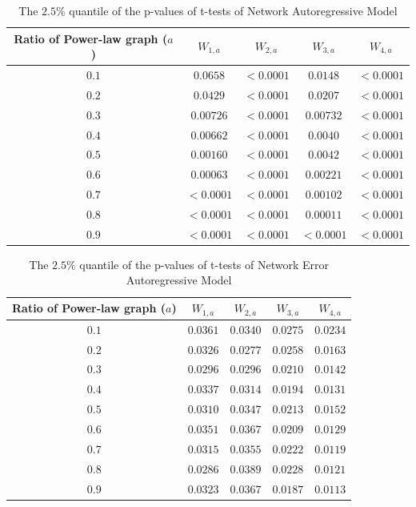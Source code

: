 \documentclass[times, doublespace]{auth}
\begin{document}
\begin{table}
	\centering
	\caption{The $2.5\%$ quantile of the p-values of t-tests of Network Autoregressive Model}
	\label{table2c}
	\begin{tabular}{|c|c|c|c|c|}
		\hline
		Ratio of Power-law graph ($a$)&$W_{1,a}$&$W_{2,a}$&$W_{3,a}$&$W_{4,a}$\\
		\hline
		$0.1$ & $0.0658$ & $< 0.0001$ & $0.0148$ & $< 0.0001$\\
		\hline
		$0.2$ & $0.0429$ & $< 0.0001$ & $0.0207$ & $< 0.0001$\\
		\hline
		$0.3$ & $0.00726$ & $< 0.0001$ & $0.00732$ & $< 0.0001$\\
		\hline
		$0.4$ & $0.00662$ & $< 0.0001$ & $0.0040$ & $< 0.0001$\\
		\hline
		$0.5$ & $0.00160$ & $< 0.0001$ & $0.0042$ & $< 0.0001$\\
		\hline
		$0.6$ & $0.00063$ & $< 0.0001$ & $0.00221$ & $< 0.0001$\\
		\hline
		$0.7$ &  $< 0.0001$ & $< 0.0001$ & $0.00102$ & $< 0.0001$\\
		\hline
		$0.8$ &  $< 0.0001$ & $< 0.0001$ & $0.00011$ & $< 0.0001$\\
		\hline
		$0.9$ &  $< 0.0001$ & $< 0.0001$ & $< 0.0001$ & $< 0.0001$\\
		\hline
	\end{tabular}
\end{table}

\begin{table}
	\centering
	\caption{The $2.5\%$ quantile of the p-values of t-tests of Network Error Autoregressive Model}
	\label{table2d}
	\begin{tabular}{|c|c|c|c|c|}
		\hline
		Ratio of Power-law graph ($a$) &$W_{1,a}$&$W_{2,a}$&$W_{3,a}$&$W_{4,a}$\\
		\hline
		$0.1$ & $0.0361$ & $0.0340$ & $0.0275$ & $0.0234$\\
		\hline
		$0.2$ & $0.0326$ & $0.0277$ & $0.0258$ & $0.0163$\\
		\hline
		$0.3$ & $0.0296$ & $0.0296$ & $0.0210$ & $0.0142$\\
		\hline
		$0.4$ & $0.0337$ & $0.0314$ & $0.0194$ & $0.0131$\\
		\hline
		$0.5$ & $0.0310$ & $0.0347$ & $0.0213$ & $0.0152$\\
		\hline
		$0.6$ &  $0.0351$ & $0.0367$ & $0.0209$ & $0.0129$\\
		\hline
		$0.7$ & $0.0315$ & $0.0355$ & $0.0222$ & $0.0119$\\
		\hline
		$0.8$ & $ 0.0286$ & $0.0389$ & $0.0228$ & $0.0121$\\
		\hline
		$0.9$ &  $0.0323$ & $0.0367$ & $0.0187$ & $0.0113$\\
		\hline
	\end{tabular}
\end{table}
\end{document}
